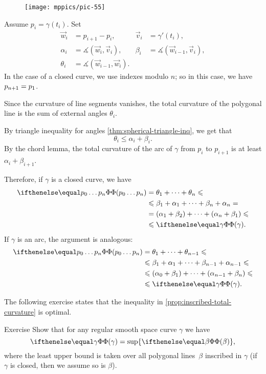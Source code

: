 \begin{wrapfigure}[7]{o}{40 mm}
\vskip-4mm
\centering
\texttt{[image: mppics/pic-55]}
\vskip0mm
\end{wrapfigure}

Assume $p_i=\gamma(t_i)$.
Set 
\begin{align*}
\vec w_i&=p_{i+1}-p_i,& \vec v_i&=\gamma'(t_i),
\\
\alpha_i&=\measuredangle(\vec w_i,\vec v_i),&\beta_i&=\measuredangle(\vec w_{i-1},\vec v_i),
\\
\theta_i&=\measuredangle(\vec w_{i-1},\vec w_i).
\end{align*}
In the case of a closed curve, we use indexes modulo $n$;
so in this case, we have $p_{n+1}\z=p_1$.

Since the curvature of line segments vanishes, 
the total curvature of the polygonal line is the sum of external angles $\theta_i$.

By triangle inequality for angles \ref{thm:spherical-triangle-inq}, we get that
\[\theta_i\le \alpha_i+\beta_i.\]
By the chord lemma, the total curvature of the arc of $\gamma$ from $p_i$ to $p_{i+1}$ is at least $\alpha_i+\beta_{i+1}$. 

Therefore, if $\gamma$ is a closed curve, we have
\begin{align*}
\tc{p_0\dots p_n}&=\theta_1+\dots+\theta_n\le 
\\
&\le\beta_1+\alpha_1+\dots+\beta_n+\alpha_n = 
\\
&=(\alpha_1+\beta_2)+\dots+(\alpha_n+\beta_1) \le 
\\
&\le \tc\gamma.
\end{align*}
If $\gamma$ is an arc, the argument is analogous:
\begin{align*}
\tc{p_0\dots p_n}&=\theta_1+\dots+\theta_{n-1}\le 
\\
&\le\beta_1+\alpha_1+\dots+\beta_{n-1}+\alpha_{n-1} \le
\\
&\le (\alpha_0+\beta_1)+\dots+(\alpha_{n-1}+\beta_n) \le 
\\
&\le \tc\gamma.
\end{align*}
\qedsf

The following exercise states that the inequality in \ref{prop:inscribed-total-curvature} is optimal.

\begin{thm}{Exercise}\label{ex:total-curvature=}
Show that for any regular smooth space curve $\gamma$ we have 
\[\tc\gamma=\sup\{\tc\beta\},\]
where the least upper bound is taken over all polygonal lines~$\beta$ inscribed in $\gamma$
(if $\gamma$ is closed, then we assume so is $\beta$).
\end{thm}

